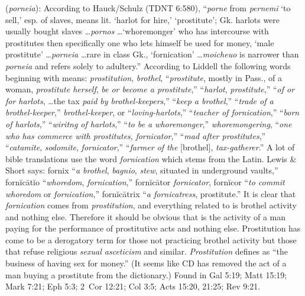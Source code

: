 \item[Prostitution,]

(\textit{porneia}):
According to Hauck/Schulz (TDNT 6:580), ``\emph{porne} from \emph{pernemi} `to sell,' esp. of slaves, means lit. `harlot for hire,' `prostitute'; Gk. harlots were usually bought slaves \ldots \emph{pornos} \ldots `whoremonger' who has intercourse with prostitutes then specifically one who lets himself be used for money, `male prostitute' \ldots \emph{porneia} \ldots rare in class Gk., `fornication' \ldots \emph{moicheuo} is narrower than \emph{porneia} and refers solely to adultery.'' According to Liddell the following words beginning with  means:  \emph{prostitution},  \emph{brothel},  ``\emph{prostitute}, mostly in Pass., of a woman, \emph{prostitute herself}, \emph{be or become a prostitute},''  ``\emph{harlot}, \emph{prostitute},''  ``\emph{of or for harlots}, \ldots the tax \emph{paid by brothel-keepers},''  ``\emph{keep a brothel},''  ``\emph{trade of a brothel-keeper},''  \emph{brothel-keeper},  or  ``\emph{loving-harlots},''  ``\emph{teacher of fornication},''  ``\emph{born of harlots},''  ``\emph{wiritng of harlots},''  ``\emph{to be a whoremonger},''  \emph{whoremongering},  ``\emph{one who has commerce with prostitutes}, \emph{fornicator},''  ``\emph{mad after prostitutes},''  ``\emph{catamite}, \emph{sodomite}, \emph{fornicator},''  ``\emph{farmer of the} [brothel], \emph{tax-gatherer}.'' A lot of bible translations use the word \emph{fornication} which stems from the Latin. Lewis \& Short says: fornix ``\emph{a brothel}, \emph{bagnio}, \emph{stew}, situated in underground vaults,'' fornĭcātĭo ``\emph{whoredom}, \emph{fornication},'' fornĭcātor \emph{fornicator}, fornĭcor ``\emph{to commit whoredom} or \emph{fornication},'' fornĭcātrix ``\emph{a fornicatress}, prostitute.'' It is clear that \emph{fornication} comes from \emph{prostitution}, and everything related to  is brothel activity and nothing else. Therefore it should be obvious that  is the activity of a man paying for the performance of prostitutive acts and nothing else. Prostitution has come to be a derogatory term for those not practicing brothel activity but those that refuse religious \emph{sexual asceticism} and similar. \emph{Prostitution} defines as ``the business of having sex for money.'' (It seems like CD has removed the act of a man buying a prostitute from the dictionary.)
Found in Gal 5:19; Matt 15:19; Mark 7:21; Eph 5:3; 2~Cor 12:21; Col 3:5; Acts 15:20, 21:25; Rev 9:21.
